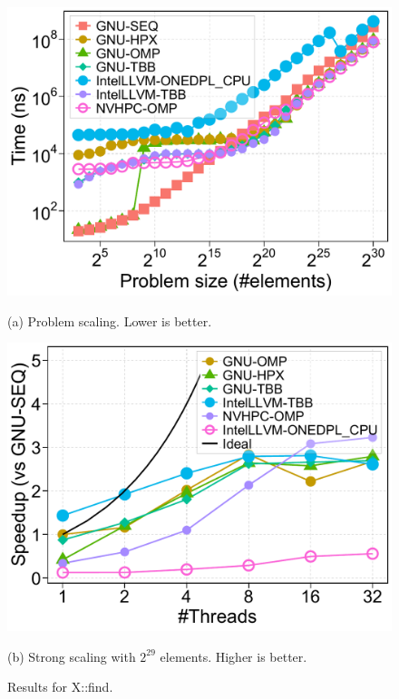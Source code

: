 \documentclass[sigconf]{acmart}
\begin{document}
\begin{figure}[H]
      \centering
      \begin{minipage}[t]{0.48\linewidth}
            \centering
            \includegraphics[width=\linewidth]{figures/problemSize_time-find}
            \caption*{(a) Problem scaling. Lower is better.}
      \end{minipage}
      \hfill
      \begin{minipage}[t]{0.48\linewidth}
            \centering
            \includegraphics[width=\linewidth]{figures/speedup_threads-find}
            \caption*{(b) Strong scaling with $2^{29}$ elements. Higher is better.}
      \end{minipage}
      \caption{Results for X::find.}\label{fig:x::find}
\end{figure}
\end{document}
